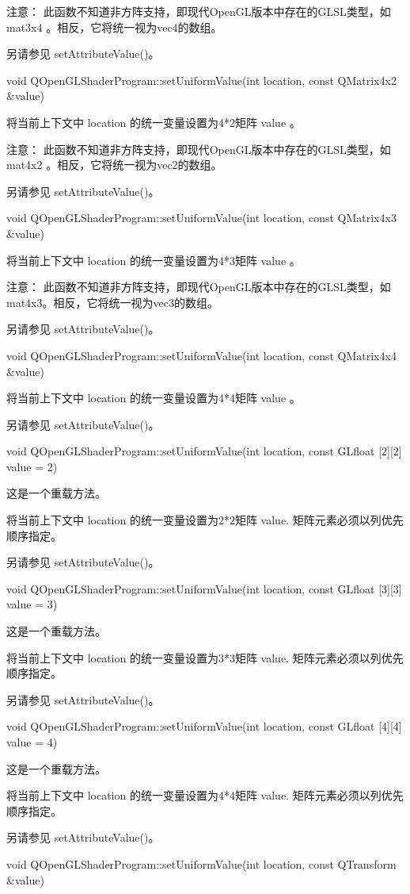 注意： 此函数不知道非方阵支持，即现代OpenGL版本中存在的GLSL类型，如 mat3x4 。相反，它将统一视为vec4的数组。

另请参见 setAttributeValue()。

void QOpenGLShaderProgram::setUniformValue(int location, const QMatrix4x2 \&value)

将当前上下文中 location 的统一变量设置为4*2矩阵 value 。

注意： 此函数不知道非方阵支持，即现代OpenGL版本中存在的GLSL类型，如 mat4x2 。相反，它将统一视为vec2的数组。

另请参见 setAttributeValue()。

void QOpenGLShaderProgram::setUniformValue(int location, const QMatrix4x3 \&value)

将当前上下文中 location 的统一变量设置为4*3矩阵 value 。

注意： 此函数不知道非方阵支持，即现代OpenGL版本中存在的GLSL类型，如 mat4x3。相反，它将统一视为vec3的数组。

另请参见 setAttributeValue()。

void QOpenGLShaderProgram::setUniformValue(int location, const QMatrix4x4 \&value)

将当前上下文中 location 的统一变量设置为4*4矩阵 value 。

另请参见 setAttributeValue()。

void QOpenGLShaderProgram::setUniformValue(int location, const GLfloat [2][2] value = 2)

这是一个重载方法。

将当前上下文中 location 的统一变量设置为2*2矩阵 value. 矩阵元素必须以列优先顺序指定。

另请参见 setAttributeValue()。

void QOpenGLShaderProgram::setUniformValue(int location, const GLfloat [3][3] value = 3)

这是一个重载方法。

将当前上下文中 location 的统一变量设置为3*3矩阵 value. 矩阵元素必须以列优先顺序指定。

另请参见 setAttributeValue()。

void QOpenGLShaderProgram::setUniformValue(int location, const GLfloat [4][4] value = 4)

这是一个重载方法。

将当前上下文中 location 的统一变量设置为4*4矩阵 value. 矩阵元素必须以列优先顺序指定。

另请参见 setAttributeValue()。

void QOpenGLShaderProgram::setUniformValue(int location, const QTransform \&value)

